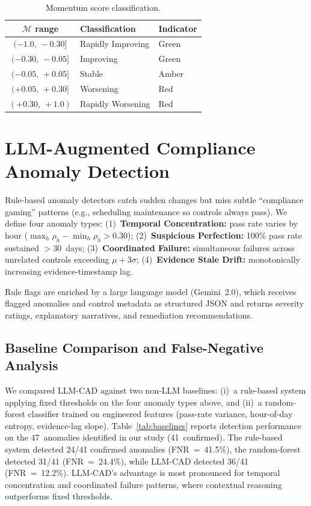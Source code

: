 \documentclass[conference]{IEEEtran}
\begin{document}
\begin{table}[h]
  \centering
  \caption{Momentum score classification.}
  \label{tab:momentum}
  \begin{tabular}{cll}
    \toprule
    $\mathcal{M}$ range & Classification & Indicator \\
    \midrule
    $(-1.0,\,-0.30]$ & Rapidly Improving & Green \\
    $(-0.30,\,-0.05]$ & Improving          & Green \\
    $(-0.05,\,+0.05]$ & Stable             & Amber \\
    $(+0.05,\,+0.30]$ & Worsening          & Red \\
    $(+0.30,\,+1.0)$  & Rapidly Worsening  & Red \\
    \bottomrule
  \end{tabular}
\end{table}

\section{LLM-Augmented Compliance Anomaly Detection}
\label{sec:llmcad}

Rule-based anomaly detectors catch sudden changes but miss subtle ``compliance gaming'' patterns (e.g., scheduling maintenance so controls always pass). We define four anomaly types: (1)~\textbf{Temporal Concentration:} pass rate varies by hour ($\max_h \rho_h - \min_h \rho_h > 0.30$); (2)~\textbf{Suspicious Perfection:} 100\% pass rate sustained $>$30~days; (3)~\textbf{Coordinated Failure:} simultaneous failures across unrelated controls exceeding $\mu + 3\sigma$; (4)~\textbf{Evidence Stale Drift:} monotonically increasing evidence-timestamp lag.

Rule flags are enriched by a large language model (Gemini~2.0), which receives flagged anomalies and control metadata as structured JSON and returns severity ratings, explanatory narratives, and remediation recommendations.

\subsection{Baseline Comparison and False-Negative Analysis}
\label{sec:baselines}
We compared LLM-CAD against two non-LLM baselines: (i)~a rule-based system applying fixed thresholds on the four anomaly types above, and (ii)~a random-forest classifier trained on engineered features (pass-rate variance, hour-of-day entropy, evidence-lag slope). Table~\ref{tab:baselines} reports detection performance on the 47~anomalies identified in our study (41~confirmed). The rule-based system detected 24/41 confirmed anomalies (FNR~=~41.5\%), the random-forest detected 31/41 (FNR~=~24.4\%), while LLM-CAD detected 36/41 (FNR~=~12.2\%). LLM-CAD's advantage is most pronounced for temporal concentration and coordinated failure patterns, where contextual reasoning outperforms fixed thresholds.
\end{document}
